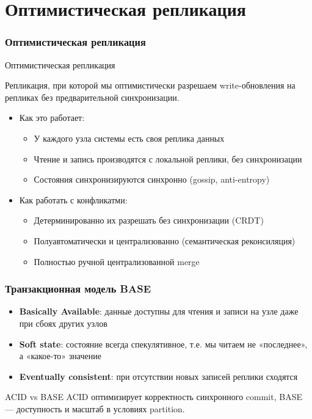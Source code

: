 \documentclass{beamer}
\newenvironment{definitionbox}[1][Определение]{%
  \begin{exampleblock}{#1}
}{%
  \end{exampleblock}
}
\begin{document}
\section{Оптимистическая репликация}

\begin{frame}
\frametitle{Оптимистическая репликация}

\begin{definitionbox}[Оптимистическая репликация]
Репликация, при которой мы оптимистически разрешаем write-обновления на репликах без предварительной синхронизации.
\end{definitionbox}

\begin{itemize}
  \item Как это работает:
  \begin{itemize}
    \item У каждого узла системы есть своя реплика данных
    \item Чтение и запись производятся с локальной реплики, без синхронизации
    \item Состояния синхронизируются синхронно (gossip, anti-entropy)
  \end{itemize}
  \item Как работать с конфликатми:
  \begin{itemize}
    \item Детерминированно их разрешать без синхронизации (CRDT)
    \item Полуавтоматически и централизованно (семантическая реконсиляция)
    \item Полностью ручной централизованной merge
  \end{itemize}
\end{itemize}

\end{frame}

\begin{frame}
\frametitle{Транзакционная модель BASE}

\begin{itemize}
  \item \textbf{Basically Available}: данные доступны для чтения и записи на узле даже при сбоях других узлов
  \item \textbf{Soft state}: состояние всегда спекулятивное, т.е. мы читаем не «последнее», а «какое-то» значение
  \item \textbf{Eventually consistent}: при отсутствии новых записей реплики сходятся
\end{itemize}

\begin{block}{ACID vs BASE}
ACID оптимизирует корректность синхронного commit, BASE --- доступность и масштаб в условиях partition.
\end{block}

\end{frame}
\end{document}
